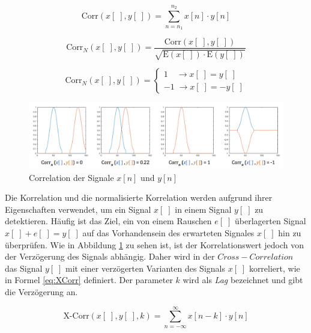 \begin{equation}
\text{Corr}(x[\;],y[\;]) = \sum_{n=n_1}^{n_2} x[n] \cdot y[n]
\label{eq:correlation}
\end{equation}

\begin{equation}
\text{Corr}_N(x[\;],y[\;]) = \frac{\text{Corr}(x[\;],y[\;])}{\sqrt{\text{E}(x[\;]) \cdot \text{E}(y[\;])}}
\label{eq:normCorrelation}
\end{equation}

\begin{equation}
\text{Corr}_N(x[\;],y[\;]) = 
\begin{cases}
1  \quad \rightarrow  x[\;] = y[\;] \\
-1 \; \rightarrow x[\;] = -y[\;]
\end{cases}
\label{eq:correlationProps}
\end{equation}

\begin{figure}[h]
	\centering
	\includegraphics[width=1\textwidth]{bilder/corrSigsComp02.png}
	\caption{Correlation der Signale $x[n]$ und $y[n]$}
	\label{img:corrSigsComp}
\end{figure}

Die Korrelation und die normalisierte Korrelation werden aufgrund ihrer Eigenschaften verwendet, um ein Signal $x[\;]$ in einem Signal $y[\;]$ zu detektieren. Häufig ist das Ziel, ein von einem Rauschen $e[\;]$ überlagerten Signal $x[\;]+e[\;] = y[\;]$ auf das Vorhandensein des erwarteten Signales $x[\;]$ hin zu überprüfen. Wie in Abbildung \ref{img:corrSigsComp} zu sehen ist, ist der Korrelationswert jedoch von der Verzögerung des Signals abhängig. Daher wird in der $Cross-Correlation$ das Signal $y[\;]$ mit einer verzögerten Varianten des Signals $x[\;]$ korreliert, wie in Formel \ref{eq:XCorr} definiert. Der parameter $k$ wird als \emph{Lag} bezeichnet und gibt die Verzögerung an. 

\begin{equation}
\text{X-Corr}(x[\;],y[\;],k) = \sum_{n=-\infty}^{\infty} x[n-k] \cdot y[n]
\label{eq:XCorr}
\end{equation}

